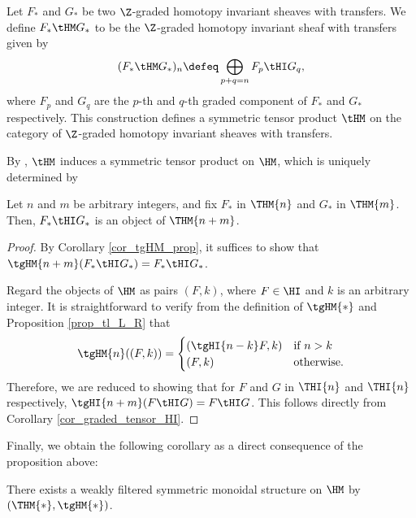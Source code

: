 \begin{defn}
Let $F_*$ and $G_*$ be two $\Z$-graded homotopy invariant sheaves
with transfers. We define $F_* \tHM G_*$ to be the $\Z$-graded 
homotopy invariant sheaf with transfers given by
\[
(F_* \tHM G_*)_n \defeq \bigoplus_{p + q = n} F_p \tHI G_q,
\]
where $F_p$ and $G_q$ are the $p$-th and $q$-th graded component
of $F_*$ and $G_*$ respectively. This construction defines a
symmetric tensor product $\tHM$ on the category of $\Z$-graded
homotopy invariant sheaves with transfers.

By \cite[1.19]{DegModHom}, $\tHM$ induces a symmetric tensor 
product on $\HM$, which is uniquely determined by
\end{defn}

\begin{prop}\label{prop_graded_mon_struct_HM}
Let $n$ and $m$ be arbitrary integers, and fix $F_*$ in $\THM{n}$ 
and $G_*$ in $\THM{m}$. Then, $F_* \tHI G_*$ is an object of 
$\THM{n + m}$.
\end{prop}
\begin{proof}
By Corollary \ref{cor_tgHM_prop}, it suffices to show that $\tgHM{n + m}(F_*
\tHI G_*) = F_* \tHI G_*$.

Regard the objects of $\HM$ as pairs $(F, k)$, where $F \in \HI$
and $k$ is an arbitrary integer. It is straightforward to 
verify from the definition of $\tgHM{*}$ and Proposition \ref{prop_tl_L_R} 
that
\[
\tgHM{n}((F, k)) = \begin{cases}
(\tgHI{n - k}F, k) &\textrm{if }n > k\\
(F, k)             &\textrm{otherwise}.
\end{cases}
\]
Therefore, we are reduced to showing that for $F$ and $G$ in
$\THI{n}$ and $\THI{n}$ respectively, 
$\tgHI{n + m}(F \tHI G) = F \tHI G$. This follows directly from 
Corollary \ref{cor_graded_tensor_HI}.
\end{proof}

Finally, we obtain the following corollary as a direct consequence
of the proposition above:

\begin{cor}\label{cor_graded_mon_struct_HM}
There exists a weakly filtered symmetric monoidal structure on $\HM$ by
$(\THM{*}, \tgHM{*})$.
\end{cor}

